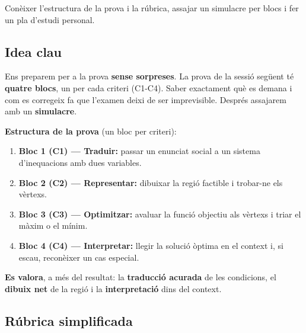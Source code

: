 %
{Conèixer l'estructura de la prova i la rúbrica, assajar un simulacre per blocs i fer un pla d'estudi personal.}

\subsection{Idea clau}

Ens preparem per a la prova \textbf{sense sorpreses}. La prova de la sessió següent té
\textbf{quatre blocs}, un per cada criteri (C1-C4). Saber exactament què es demana i
com es corregeix fa que l'examen deixi de ser imprevisible. Després assajarem amb un
\textbf{simulacre}.

\begin{idea}
\textbf{Estructura de la prova} (un bloc per criteri):
\begin{enumerate}[leftmargin=1.6em, itemsep=2pt]
  \item \textbf{Bloc 1 (C1) — Traduir:} passar un enunciat social a un sistema
        d'inequacions amb dues variables.
  \item \textbf{Bloc 2 (C2) — Representar:} dibuixar la regió factible i trobar-ne els
        vèrtexs.
  \item \textbf{Bloc 3 (C3) — Optimitzar:} avaluar la funció objectiu als vèrtexs i
        triar el màxim o el mínim.
  \item \textbf{Bloc 4 (C4) — Interpretar:} llegir la solució òptima en el context i,
        si escau, reconèixer un cas especial.
\end{enumerate}
\textbf{Es valora}, a més del resultat: la \textbf{traducció acurada} de les
condicions, el \textbf{dibuix net} de la regió i la \textbf{interpretació} dins del
context.
\end{idea}

\subsection{Rúbrica simplificada}

